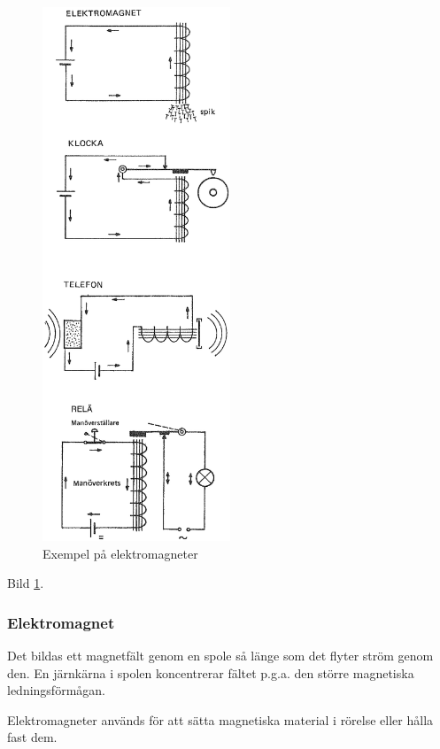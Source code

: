 \begin{figure}
  \includegraphics[width=0.5\textwidth]{images/cropped_pdfs/bild_2_1-09.pdf}
  \caption{Exempel på elektromagneter}
  \label{fig:BildII1-9}
\end{figure}

Bild \ref{fig:BildII1-9}.

\subsubsection{Elektromagnet}
Det bildas ett magnetfält genom en spole så länge som det flyter ström genom
den. En järnkärna i spolen koncentrerar fältet p.g.a. den större magnetiska
ledningsförmågan.

Elektromagneter används för att sätta magnetiska material i rörelse eller hålla
fast dem.

